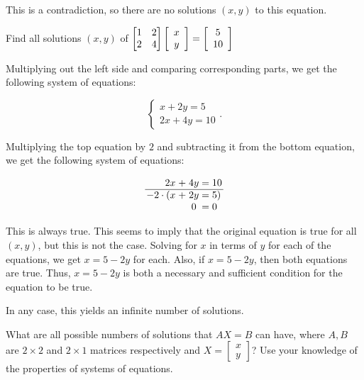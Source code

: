 \documentclass[../gatm_answers.tex]{subfiles}
\begin{document}
This is a contradiction, so there are no solutions $(x,y)$ to this equation.

\begin{inner_problem}
\item Find all solutions $(x,y)$ of $\begin{bmatrix} 1 & 2 \\ 2 & 4 \end{bmatrix}\left[\begin{array}{c} x \\ y \end{array}\right]=\left[\begin{array}{c} 5 \\ 10 \end{array}\right]$
\end{inner_problem}

Multiplying out the left side and comparing corresponding parts, we get the following system of equations:

$$\begin{cases} x + 2y = 5 \\ 2x + 4y = 10 \end{cases}.$$

Multiplying the top equation by $2$ and subtracting it from the bottom equation, we get the following system of equations:

$$\arraycolsep=1.4pt\begin{array}{rcccl}
2x & + & 4y & = & 10 \\ \hline
-2\cdot ( x & + & 2y & = & 5) \\
& & 0 & = & 0 \\
\end{array}$$

This is always true. This seems to imply that the original equation is true for all $(x,y)$, but this is not the case. Solving for $x$ in terms of $y$ for each of the equations, we get $x=5-2y$ for each. Also, if $x=5-2y$, then both equations are true. Thus, $x=5-2y$ is both a necessary and sufficient condition for the equation to be true.

In any case, this yields an infinite number of solutions.

\begin{inner_problem}
\item What are all possible numbers of solutions that $AX=B$ can have, where $A,B$ are $2\times 2$ and $2\times 1$ matrices respectively and $X=\left[\begin{smallmatrix} x \\ y \end{smallmatrix}\right]$? Use your knowledge of the properties of systems of equations.
\end{inner_problem}
\end{document}
